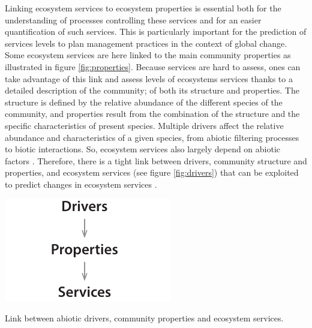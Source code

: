 Linking ecosystem services to ecosystem properties is essential both for the understanding of processes controlling these services and for an easier quantification of such services. This is particularly important for the prediction of services levels to plan management practices in the context of global change. Some ecosystem services are here linked to the main community properties as illustrated in figure  \ref{fig:properties}. Because services are hard to assess, ones can take advantage of this link and assess levels of ecosystems services thanks to a detailed description of the community; of both its structure and properties. The structure is defined by the relative abundance of the different species of the community, and properties result from the combination of the structure and the specific characteristics of present species. Multiple drivers affect the relative abundance and characteristics of a given species, from abiotic filtering processes to biotic interactions. So, ecosystem services also largely depend on abiotic factors \parencite{lavorel_predicting_2002}. Therefore, there is a tight link between drivers, community structure and properties, and ecosystem services (see figure \ref{fig:drivers}) that can be exploited to predict changes in ecosystem services \parencite{lamarque_plant_2014}. 


\begin{marginfigure}
    \includegraphics{./1_Introduction/graphics/drivers_properties_services_m.pdf}
  \caption[Drivers to services]{Link between abiotic drivers, community properties and ecosystem services.}
  \label{fig:drivers}
\end{marginfigure}


